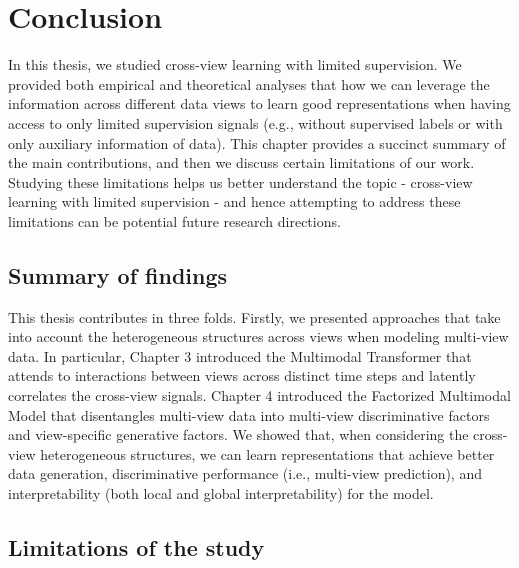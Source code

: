 \section{Conclusion}

In this thesis, we studied cross-view learning with limited supervision. We provided both empirical
and theoretical analyses that how we can leverage the information across different data views to learn
good representations when having access to only limited supervision signals (e.g., without supervised
labels or with only auxiliary information of data). This chapter provides a succinct summary of the main
contributions, and then we discuss certain limitations of our work. Studying these limitations helps us
better understand the topic - cross-view learning with limited supervision - and hence attempting to address
these limitations can be potential future research directions.



\subsection{Summary of findings}

This thesis contributes in three folds. Firstly, we presented approaches that take into account the heterogeneous structures across views when modeling multi-view data. In particular,
Chapter 3 introduced the Multimodal Transformer that attends to interactions between views across distinct time steps and latently
correlates the cross-view signals. Chapter 4 introduced the Factorized Multimodal Model that disentangles
multi-view data into multi-view discriminative factors and view-specific generative factors. We showed
that, when considering the cross-view heterogeneous structures, we can learn representations that achieve
better data generation, discriminative performance (i.e., multi-view prediction), and interpretability (both
local and global interpretability) for the model.

\subsection{Limitations of the study}

